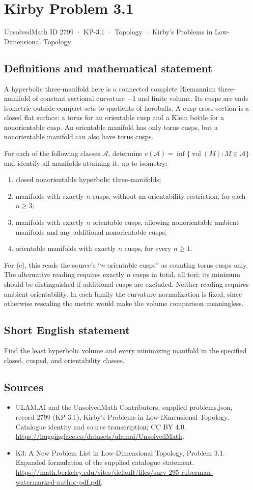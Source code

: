 \documentclass[11pt,a4paper]{article}
\begin{document}
\section*{Kirby Problem 3.1}\label{2799}
{\small UnsolvedMath ID 2799 · KP-3.1 · Topology · Kirby's Problems in Low-Dimensional Topology}
\subsection{Definitions and mathematical statement}
A hyperbolic three-manifold here is a connected complete Riemannian
three-manifold of constant sectional curvature $-1$ and finite volume.
Its cusps are ends isometric outside compact sets to quotients of horoballs.
A cusp cross-section is a closed flat surface: a torus for an orientable
cusp and a Klein bottle for a nonorientable cusp. An orientable manifold
has only torus cusps, but a nonorientable manifold can also have torus cusps.

For each of the following classes $\mathcal A$, determine
$v(\mathcal A)=\inf\{\operatorname{vol}(M):M\in\mathcal A\}$ and identify
all manifolds attaining it, up to isometry:
\begin{enumerate}
\item closed nonorientable hyperbolic three-manifolds;
\item manifolds with exactly $n$ cusps, without an orientability restriction,
for each $n\geq3$;
\item manifolds with exactly $n$ orientable cusps, allowing nonorientable
ambient manifolds and any additional nonorientable cusps;
\item orientable manifolds with exactly $n$ cusps, for every $n\geq1$.
\end{enumerate}
For (c), this reads the source's ``$n$ orientable cusps'' as counting torus
cusps only. The alternative reading requires exactly $n$ cusps in total,
all tori; its minimum should be distinguished if additional cusps are excluded.
Neither reading requires ambient orientability. In each family the curvature normalization is fixed, since otherwise
rescaling the metric would make the volume comparison meaningless.
\subsection{Short English statement}
Find the least hyperbolic volume and every minimizing manifold in the specified closed, cusped, and orientability classes.
\subsection{Sources}
\begin{itemize}
\item[S1] ULAM.AI and the UnsolvedMath Contributors, supplied problems.json, record 2799 (KP-3.1), Kirby's Problems in Low-Dimensional Topology. Catalogue identity and source transcription; CC BY 4.0.
\url{https://huggingface.co/datasets/ulamai/UnsolvedMath}.
\item[S2] K3: A New Problem List in Low-Dimensional Topology, Problem 3.1. Expanded formulation of the supplied catalogue statement.
\url{https://math.berkeley.edu/sites/default/files/surv-295-ruberman-watermarked-author-pdf.pdf}.
\end{itemize}
\end{document}
